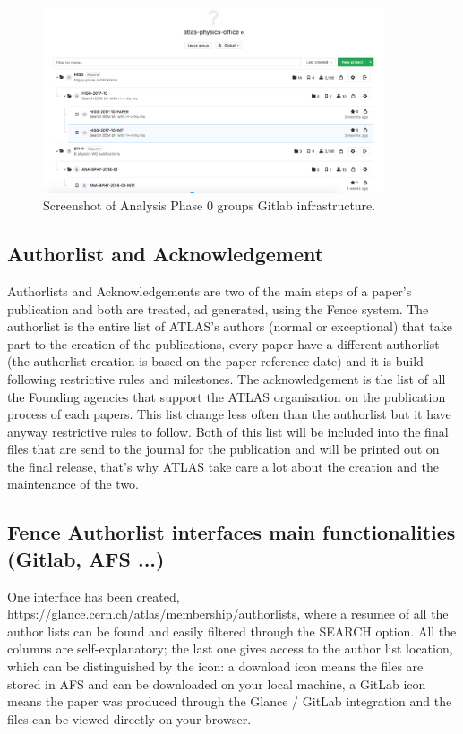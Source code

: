 \begin{figure}[ht!]
  \centering
  \includegraphics[width=0.9\textwidth]{po-ana-tree.png}
  \caption{Screenshot of Analysis Phase 0 groups Gitlab infrastructure.}
  \label{fig:po-ana-tree}
\end{figure}

\subsection{Authorlist and Acknowledgement}

Authorlists and Acknowledgements are two of the main steps of a paper’s publication and both are treated, ad generated, using the Fence system. 
The authorlist is the entire list of ATLAS’s authors (normal or exceptional) that take part to the creation of the publications, every paper have a different authorlist (the authorlist creation is based on the paper reference date) and it is build following restrictive rules and milestones.
The acknowledgement is the list of all the Founding agencies that support the ATLAS organisation on the publication process of each papers. This list change less often than the authorlist but it have anyway restrictive rules to follow.
Both of this list will be included into the final files that are send to the journal for the publication and will be printed out on the final release, that’s why ATLAS take care a lot about the creation and the maintenance of the two. 

\subsection{Fence Authorlist interfaces main functionalities (Gitlab, AFS ...)}

One interface has been created, https://glance.cern.ch/atlas/membership/authorlists, where a resumee of all the author lists can be found and easily filtered through the SEARCH option.
All the columns are self-explanatory; the last one gives access to the author list location, which can be distinguished by the icon: a download icon means the files are stored in AFS and can be downloaded on your local machine, a GitLab icon means the paper was produced through the Glance / GitLab integration and the files can be viewed directly on your browser. 

